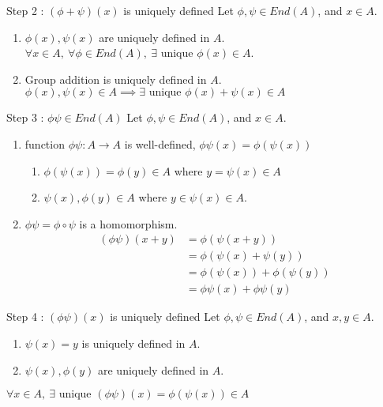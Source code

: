 \documentclass{beamer}
\begin{document}
\begin{frame}{Step 2 : $(\phi + \psi)(x)$ is uniquely defined}
	Let $\phi,\psi \in End(A)$, and $x \in A$.
	\begin{enumerate}
		\item $\phi(x), \psi(x)$ are uniquely defined in $A$.\\
			$\forall x \in A,\ \forall \phi \in End(A),\ \exists \text{ unique } \phi(x) \in A$.
		\item Group addition is uniquely defined in $A$.\\
			{\color{red}$\phi(x), \psi(x) \in A \implies \exists \text{ unique }\phi(x) + \psi(x) \in A$}
	\end{enumerate}
\end{frame}

\begin{frame}{Step 3 : $\phi\psi \in End(A)$}
	Let $\phi,\psi \in End(A)$, and $x \in A$.
	\begin{enumerate}
		\item function $\phi\psi : A \to A$ is well-defined, $\phi\psi (x) = \phi(\psi(x))$
		\begin{enumerate}
			\item $\phi(\psi(x)) = \phi(y) \in A$ where $y = \psi(x) \in A$
			\item $\psi(x),\phi(y) \in A$ where $y \in \psi(x) \in A$.
			\end{enumerate}
		\item $\phi\psi = \phi \circ \psi$ is a homomorphism.
			\begin{align}
				(\phi\psi)(x + y) & = \phi(\psi(x+y)) \\
				& = \phi(\psi(x)+\psi(y)) \\
				& = \phi(\psi(x)) + \phi(\psi(y)) \\
				& = \phi\psi(x) + \phi\psi(y)
			\end{align}
	\end{enumerate}
\end{frame}

\begin{frame}{Step 4 : $(\phi\psi)(x)$ is uniquely defined}
	Let $\phi,\psi \in End(A)$, and $x,y \in A$.
	\begin{enumerate}
		\item $\psi(x) = y$ is uniquely defined in $A$.
		\item $\psi(x),\phi(y)$ are uniquely defined in $A$.
	\end{enumerate}

	$\forall x \in A,\ \exists \text{ unique } (\phi\psi)(x) = \phi(\psi(x)) \in A $ 
\end{frame}
\end{document}
